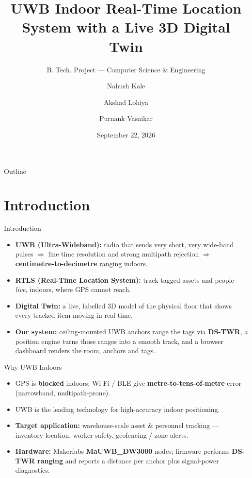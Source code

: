 \documentclass[aspectratio=169,10pt]{beamer}
\title[UWB Indoor RTLS + Digital Twin]{UWB Indoor Real-Time Location System with a Live 3D Digital Twin}
\subtitle{B. Tech. Project — Computer Science \& Engineering}
\author[Kale, Lohiya, Vasaikar]{Nahush Kale \and Akshad Lohiya \and Purnank Vasaikar}
\institute[COEP Tech]{Department of Computer Science \& Engineering\\
COEP Technological University, Pune\\[4pt]
\textit{Under the guidance of} Prof. Dr. H. D. Gadade}
\date{September 22, 2026}
\begin{document}
{          %
\begin{frame}[plain]
  \titlepage
\end{frame}}

\begin{frame}{Outline}
  \tableofcontents
\end{frame}

\section{Introduction}
\begin{frame}{Introduction}
  \begin{itemize}
    \item \textbf{UWB (Ultra-Wideband):} radio that sends very short, very wide-band
          pulses $\Rightarrow$ fine time resolution and strong multipath rejection
          $\Rightarrow$ \textbf{centimetre-to-decimetre} ranging indoors.
    \item \textbf{RTLS (Real-Time Location System):} track tagged assets and people
          \emph{live}, indoors, where GPS cannot reach.
    \item \textbf{Digital Twin:} a live, labelled 3D model of the physical floor that
          shows every tracked item moving in real time.
    \item \textbf{Our system:} ceiling-mounted UWB anchors range the tags via
          \textbf{DS-TWR}, a position engine turns those ranges into a smooth track,
          and a browser dashboard renders the room, anchors and tags.
  \end{itemize}
\end{frame}

\begin{frame}{Why UWB Indoors}
  \begin{itemize}
    \item GPS is \textbf{blocked} indoors; Wi-Fi / BLE give \textbf{metre-to-tens-of-metre}
          error (narrowband, multipath-prone).
    \item UWB is the leading technology for high-accuracy indoor positioning.
    \item \textbf{Target application:} warehouse-scale asset \& personnel tracking ---
          inventory location, worker safety, geofencing / zone alerts.
    \item \textbf{Hardware:} Makerfabs \textbf{MaUWB\_DW3000} nodes; firmware performs
          \textbf{DS-TWR ranging} and reports a distance per anchor plus signal-power
          diagnostics.
  \end{itemize}
\end{frame}
\end{document}
